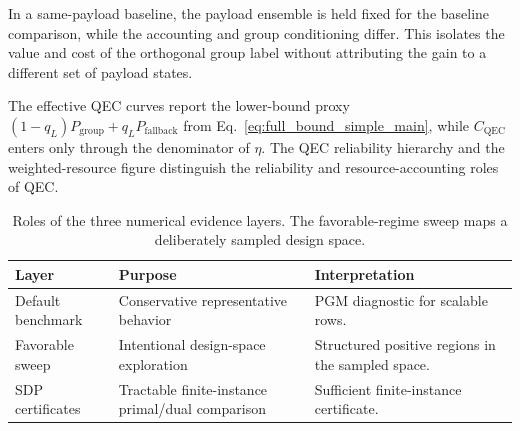 \documentclass[
 reprint,
 amsmath,amssymb,
 aps,
 pra,
 floatfix,
]{revtex4-2}
\begin{document}
In a same-payload baseline, the payload ensemble is held fixed for the baseline comparison, while the accounting and group conditioning differ. This isolates the value and cost of the orthogonal group label without attributing the gain to a different set of payload states.

The effective QEC curves report the lower-bound proxy \((1-q_L)P_{\mathrm{group}}+q_LP_{\mathrm{fallback}}\) from Eq.~\eqref{eq:full_bound_simple_main}, while \(C_{\mathrm{QEC}}\) enters only through the denominator of \(\eta\). The QEC reliability hierarchy and the weighted-resource figure distinguish the reliability and resource-accounting roles of QEC.

\begin{table}[tbp]
\caption{\label{tab:numerical-roles}Roles of the three numerical evidence layers. The favorable-regime sweep maps a deliberately sampled design space.}
\scriptsize
\begin{ruledtabular}
\begin{tabular}{lll}
Layer & Purpose & Interpretation\\
\hline
Default benchmark & Conservative representative behavior & PGM diagnostic for scalable rows.\\
Favorable sweep & Intentional design-space exploration & Structured positive regions in the sampled space.\\
SDP certificates & Tractable finite-instance primal/dual comparison & Sufficient finite-instance certificate.\\
\end{tabular}
\end{ruledtabular}
\end{table}

\begin{table}[tbp]
\caption{\label{tab:baseline-fairness}Baseline fairness and accounting conventions. ``SDP/PGM'' means numerical SDP for the tractable certificate rows and PGM for scalable diagnostics.}
\scriptsize
{}
\end{table}
\end{document}
